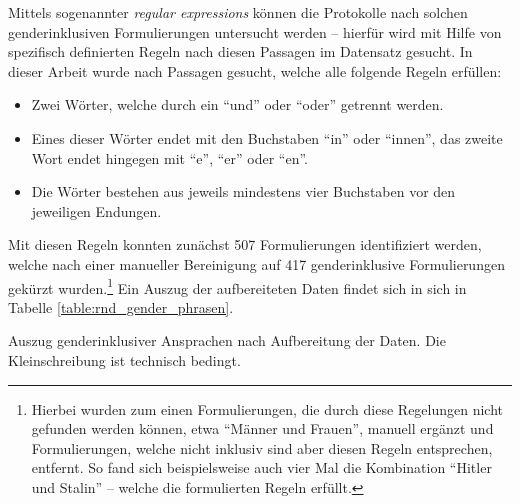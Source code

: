 \documentclass[12pt, 
    twoside=false, 
    bibliography=totoc, 
    numbers=endperiod, 
    headings=normal, 
    toc=chapterentrydotfill
    ]{scrbook}
\begin{document}

Mittels sogenannter \emph{regular expressions} \parencite{thompson_1968} können die Protokolle nach solchen genderinklusiven Formulierungen untersucht werden -- hierfür wird mit Hilfe von spezifisch definierten Regeln nach diesen Passagen im Datensatz gesucht. In dieser Arbeit wurde nach Passagen gesucht, welche alle folgende Regeln erfüllen:
\begin{itemize}
    \setlength\itemsep{0em}
    \item Zwei Wörter, welche durch ein \enquote{und} oder \enquote{oder} getrennt werden.
    \item Eines dieser Wörter endet mit den Buchstaben \enquote{in} oder \enquote{innen}, das zweite Wort endet hingegen mit \enquote{e}, \enquote{er} oder \enquote{en}.
    \item Die Wörter bestehen aus jeweils mindestens vier Buchstaben vor den jeweiligen Endungen.
\end{itemize}

Mit diesen Regeln konnten zunächst 507 Formulierungen identifiziert werden, welche nach einer manueller Bereinigung auf 417 genderinklusive Formulierungen gekürzt wurden.\footnote{Hierbei wurden zum einen Formulierungen, die durch diese Regelungen nicht gefunden werden können, etwa \enquote{Männer und Frauen}, manuell ergänzt und Formulierungen, welche nicht inklusiv sind aber diesen Regeln entsprechen, entfernt. So fand sich beispielsweise auch vier Mal die Kombination \enquote{Hitler und Stalin} -- welche die formulierten Regeln erfüllt.} Ein Auszug der aufbereiteten Daten findet sich in sich in Tabelle \ref{table:rnd_gender_phrasen}. 

\begin{table}[htb]
    \centering
    \caption[Auszug genderinklusiver Ansprachen nach Aufbereitung der Daten]{Auszug genderinklusiver Ansprachen nach Aufbereitung der Daten. Die Kleinschreibung ist technisch bedingt.}
    
    \label{table:rnd_gender_phrasen}
\end{table}
\end{document}
